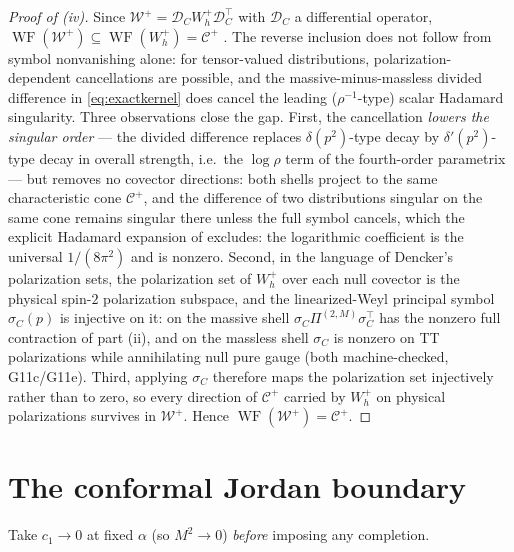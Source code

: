 \documentclass[11pt]{article}
\theoremstyle{definition}
\theoremstyle{remark}
\newcommand{\WF}{\operatorname{WF}}
\begin{document}
\begin{proof}[Proof of (iv)]
Since $\mathcal W^+=\mathcal D_C W^+_h\mathcal D_C^\top$ with $\mathcal
D_C$ a differential operator, $\WF(\mathcal W^+)\subseteq\WF(W^+_h)
=\mathcal C^+$ \cite{companion3}.  The reverse inclusion does not follow
from symbol nonvanishing alone: for tensor-valued distributions,
polarization-dependent cancellations are possible, and the
massive-minus-massless divided difference in \eqref{eq:exactkernel} does
cancel the leading ($\rho^{-1}$-type) scalar Hadamard singularity.  Three
observations close the gap.  First, the cancellation \emph{lowers the
singular order} --- the divided difference replaces $\delta(p^2)$-type
decay by $\delta'(p^2)$-type decay in overall strength, i.e.\ the
$\log\rho$ term of the fourth-order parametrix --- but removes no
covector directions: both shells project to the same characteristic cone
$\mathcal C^+$, and the difference of two distributions singular on the
same cone remains singular there unless the full symbol cancels, which
the explicit Hadamard expansion of \cite{companion3} excludes: the
logarithmic coefficient is the universal $1/(8\pi^2)$ and is nonzero.
Second, in the language of Dencker's polarization sets, the polarization
set of $W^+_h$ over each null covector is the physical spin-$2$
polarization subspace, and the linearized-Weyl principal symbol
$\sigma_C(p)$ is injective on it: on the massive shell
$\sigma_C\Pi^{(2,M)}\sigma_C^{\top}$ has the nonzero full contraction of
part (ii), and on the massless shell $\sigma_C$ is nonzero on TT
polarizations while annihilating null pure gauge (both machine-checked,
G11c/G11e).  Third, applying $\sigma_C$ therefore maps the polarization
set injectively rather than to zero, so every direction of
$\mathcal C^+$ carried by $W^+_h$ on physical polarizations survives in
$\mathcal W^+$.  Hence $\WF(\mathcal W^+)=\mathcal C^+$.
\end{proof}

\section{The conformal Jordan boundary}\label{sec:conformal}

Take $c_1\to0$ at fixed $\alpha$ (so $M^2\to0$) \emph{before} imposing any
completion.
\end{document}
